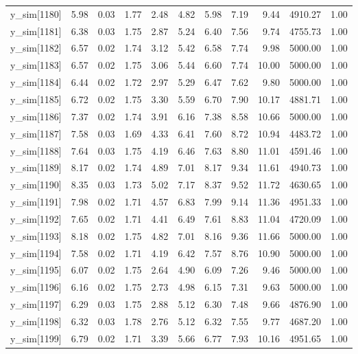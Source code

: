 \begin{table}[ht]
\begin{tabular}{rrrrrrrrrrr}
  y\_sim[1180] & 5.98 & 0.03 & 1.77 & 2.48 & 4.82 & 5.98 & 7.19 & 9.44 & 4910.27 & 1.00 \\ 
  y\_sim[1181] & 6.38 & 0.03 & 1.75 & 2.87 & 5.24 & 6.40 & 7.56 & 9.74 & 4755.73 & 1.00 \\ 
  y\_sim[1182] & 6.57 & 0.02 & 1.74 & 3.12 & 5.42 & 6.58 & 7.74 & 9.98 & 5000.00 & 1.00 \\ 
  y\_sim[1183] & 6.57 & 0.02 & 1.75 & 3.06 & 5.44 & 6.60 & 7.74 & 10.00 & 5000.00 & 1.00 \\ 
  y\_sim[1184] & 6.44 & 0.02 & 1.72 & 2.97 & 5.29 & 6.47 & 7.62 & 9.80 & 5000.00 & 1.00 \\ 
  y\_sim[1185] & 6.72 & 0.02 & 1.75 & 3.30 & 5.59 & 6.70 & 7.90 & 10.17 & 4881.71 & 1.00 \\ 
  y\_sim[1186] & 7.37 & 0.02 & 1.74 & 3.91 & 6.16 & 7.38 & 8.58 & 10.66 & 5000.00 & 1.00 \\ 
  y\_sim[1187] & 7.58 & 0.03 & 1.69 & 4.33 & 6.41 & 7.60 & 8.72 & 10.94 & 4483.72 & 1.00 \\ 
  y\_sim[1188] & 7.64 & 0.03 & 1.75 & 4.19 & 6.46 & 7.63 & 8.80 & 11.01 & 4591.46 & 1.00 \\ 
  y\_sim[1189] & 8.17 & 0.02 & 1.74 & 4.89 & 7.01 & 8.17 & 9.34 & 11.61 & 4940.73 & 1.00 \\ 
  y\_sim[1190] & 8.35 & 0.03 & 1.73 & 5.02 & 7.17 & 8.37 & 9.52 & 11.72 & 4630.65 & 1.00 \\ 
  y\_sim[1191] & 7.98 & 0.02 & 1.71 & 4.57 & 6.83 & 7.99 & 9.14 & 11.36 & 4951.33 & 1.00 \\ 
  y\_sim[1192] & 7.65 & 0.02 & 1.71 & 4.41 & 6.49 & 7.61 & 8.83 & 11.04 & 4720.09 & 1.00 \\ 
  y\_sim[1193] & 8.18 & 0.02 & 1.75 & 4.82 & 7.01 & 8.16 & 9.36 & 11.66 & 5000.00 & 1.00 \\ 
  y\_sim[1194] & 7.58 & 0.02 & 1.71 & 4.19 & 6.42 & 7.57 & 8.76 & 10.90 & 5000.00 & 1.00 \\ 
  y\_sim[1195] & 6.07 & 0.02 & 1.75 & 2.64 & 4.90 & 6.09 & 7.26 & 9.46 & 5000.00 & 1.00 \\ 
  y\_sim[1196] & 6.16 & 0.02 & 1.75 & 2.73 & 4.98 & 6.15 & 7.31 & 9.63 & 5000.00 & 1.00 \\ 
  y\_sim[1197] & 6.29 & 0.03 & 1.75 & 2.88 & 5.12 & 6.30 & 7.48 & 9.66 & 4876.90 & 1.00 \\ 
  y\_sim[1198] & 6.32 & 0.03 & 1.78 & 2.76 & 5.12 & 6.32 & 7.55 & 9.77 & 4687.20 & 1.00 \\ 
  y\_sim[1199] & 6.79 & 0.02 & 1.71 & 3.39 & 5.66 & 6.77 & 7.93 & 10.16 & 4951.65 & 1.00 \\ 

\end{tabular}
\end{table}
